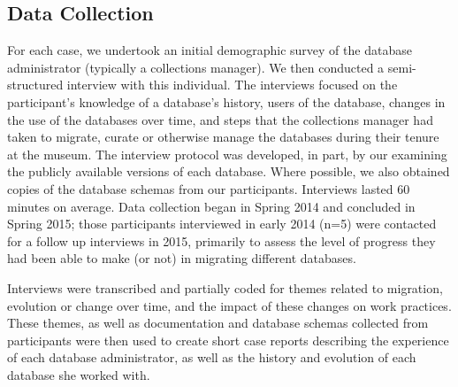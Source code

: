 \subsection{Data Collection}

For each case, we undertook an initial demographic survey of the database administrator (typically a collections manager). We then conducted a semi-structured interview with this individual. The interviews focused on the participant's knowledge of a database's history, users of the database, changes in the use of the databases over time, and steps that the collections manager had taken to migrate, curate or otherwise manage the databases during their tenure at the museum. The interview protocol was developed, in part, by our examining the publicly available versions of each database. Where possible, we also obtained copies of the database schemas from our participants. Interviews lasted 60 minutes on average. Data collection began in Spring 2014 and concluded in Spring 2015; those participants interviewed in early 2014 (n=5) were contacted for a follow up interviews in 2015, primarily to assess the level of progress they had been able to make (or not) in migrating different databases.

Interviews were transcribed and partially coded for themes related to migration, evolution or change over time, and the impact of these changes on work practices. These themes, as well as documentation and database schemas collected from participants were then used to create short case reports describing the experience of each database administrator, as well as the history and evolution of each database she worked with. 